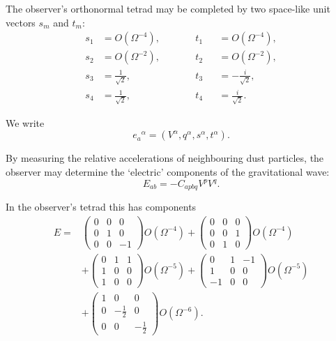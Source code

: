 The observer's orthonormal tetrad may be completed by two
space-like unit vectors $s_m$ and $t_m$:
\begin{equation}
\begin{alignedat}{4}
s_1&=O(\Omega^{-4}), &\qquad& t_1&&=O(\Omega^{-4}),\\
s_2&=O(\Omega^{-2}), && t_2&&=O(\Omega^{-2}),\\
s_3&=\frac{1}{\sqrt{2}}, && t_3&&=-\frac{i}{\sqrt{2}},\\
s_4&=\frac{1}{\sqrt{2}}, && t_4&&=\frac{i}{\sqrt{2}}.
\end{alignedat}
\tag{9.3}
\end{equation}

We write
\[
e_a{}^{\alpha}=(V^{\alpha},q^{\alpha},s^{\alpha},t^{\alpha}).
\]

By measuring the relative accelerations of neighbouring dust
particles, the observer may determine the `electric'
components of the gravitational wave:
\[
E_{ab}=-C_{apbq}V^pV^q.
\]

In the observer's tetrad this has components
\begin{equation}
\begin{aligned}
E={}&
\begin{pmatrix}
0&0&0\\
0&1&0\\
0&0&-1
\end{pmatrix}O(\Omega^{-4})
+
\begin{pmatrix}
0&0&0\\
0&0&1\\
0&1&0
\end{pmatrix}O(\Omega^{-4})
\\[1ex]
&+
\begin{pmatrix}
0&1&1\\
1&0&0\\
1&0&0
\end{pmatrix}O(\Omega^{-5})
+
\begin{pmatrix}
0&1&-1\\
1&0&0\\
-1&0&0
\end{pmatrix}O(\Omega^{-5})
\\[1ex]
&+
\begin{pmatrix}
1&0&0\\
0&-\frac{1}{2}&0\\
0&0&-\frac{1}{2}
\end{pmatrix}O(\Omega^{-6}).
\end{aligned}
\tag{9.4}
\end{equation}

